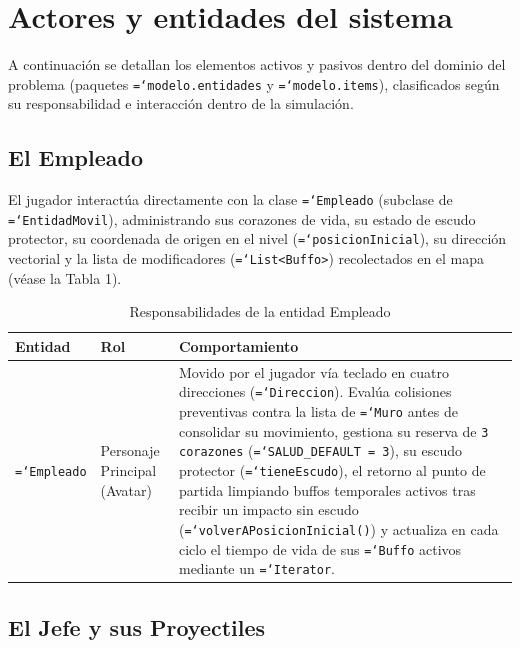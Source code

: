 \documentclass[12pt, a4paper]{article}
\DeclareRobustCommand{\code}[1]{\textcolor{codegreen}{\texttt{\hyphenchar\font=`\-#1}}}
\begin{document}
\section{Actores y entidades del sistema}

A continuación se detallan los elementos activos y pasivos dentro del dominio del problema (paquetes \code{modelo.entidades} y \code{modelo.items}), clasificados según su responsabilidad e interacción dentro de la simulación.

\subsection{El Empleado}

El jugador interactúa directamente con la clase \code{Empleado} (subclase de \code{EntidadMovil}), administrando sus corazones de vida, su estado de escudo protector, su coordenada de origen en el nivel (\code{posicionInicial}), su dirección vectorial y la lista de modificadores (\code{List<Buffo>}) recolectados en el mapa (véase la Tabla 1).

\begin{table}[H]
\caption{Responsabilidades de la entidad Empleado}
\begin{tabularx}{\textwidth}{@{} >{\raggedright\arraybackslash}p{2.9cm} >{\raggedright\arraybackslash}p{3.5cm} >{\raggedright\arraybackslash}X @{}}
\toprule
\textbf{Entidad} & \textbf{Rol} & \textbf{Comportamiento} \\
\midrule
\code{Empleado} & Personaje Principal (Avatar) & Movido por el jugador vía teclado en cuatro direcciones (\code{Direccion}). Evalúa colisiones preventivas contra la lista de \code{Muro} antes de consolidar su movimiento, gestiona su reserva de \texttt{3 corazones} (\code{SALUD\_DEFAULT = 3}), su escudo protector (\code{tieneEscudo}), el retorno al punto de partida limpiando buffos temporales activos tras recibir un impacto sin escudo (\code{volverAPosicionInicial()}) y actualiza en cada ciclo el tiempo de vida de sus \code{Buffo} activos mediante un \code{Iterator}. \\
\bottomrule
\end{tabularx}
\end{table}

\subsection{El Jefe y sus Proyectiles}
\end{document}
